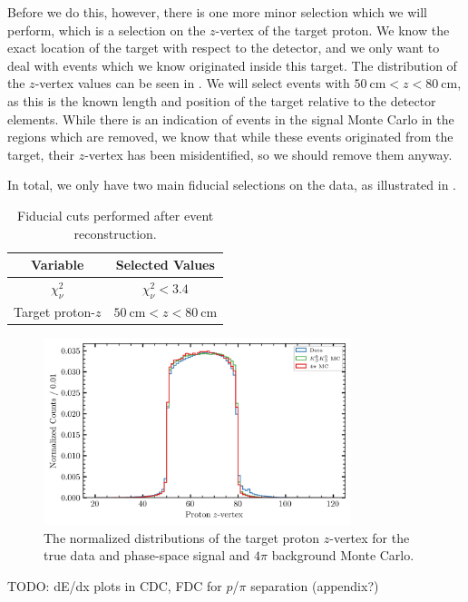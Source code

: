 Before we do this, however, there is one more minor selection which we will perform, which is a selection on the $z$-vertex of the target proton. We know the exact location of the target with respect to the detector, and we only want to deal with events which we know originated inside this target. The distribution of the $z$-vertex values can be seen in . We will select events with $\SI{50}{\centi\meter} < z < \SI{80}{\centi\meter}$, as this is the known length and position of the target relative to the detector elements. While there is an indication of events in the signal Monte Carlo in the regions which are removed, we know that while these events originated from the target, their $z$-vertex has been misidentified, so we should remove them anyway.

In total, we only have two main fiducial selections on the data, as illustrated in .

\begin{table}
  \begin{center}
    \begin{tabular}{cc}\toprule
      Variable & Selected Values \\\midrule
      $\chi^2_\nu$ & $\chi^2_\nu < 3.4$ \\
      Target proton-$z$ & $\SI{50}{\centi\meter} < z < \SI{80}{\centi\meter}$ \\\bottomrule
    \end{tabular}
    \caption{Fiducial cuts performed after event reconstruction.}\label{tab:fiducial-cuts}
  \end{center}
\end{table}

\begin{figure}
  \begin{center}
    \includegraphics[width=0.8\textwidth]{figures/data_original_combined_protonz.png}
  \end{center}
  \caption{The normalized distributions of the target proton $z$-vertex for the true data and phase-space signal and $4\pi$ background Monte Carlo.}\label{fig:data-original-combined-protonz}
\end{figure}

{\color{red}TODO: dE/dx plots in CDC, FDC for $p$/$\pi$ separation (appendix?)}
